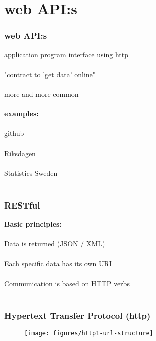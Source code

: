 \documentclass{beamer}
\begin{document}
\section{web API:s}

\begin{frame}
	\frametitle{web API:s}
	\begin{center}
		application program interface using http  \\~\\
		"contract to 'get data' online"  \\~\\
		more and more common  \\~\\
		\textbf{examples:}  \\~\\
		github \\~\\
		Riksdagen \\~\\
		Statistics Sweden \\~\\
	\end{center}
\end{frame}

\begin{frame}
	\frametitle{RESTful}
	\begin{center}
		\textbf{Basic principles:} \\~\\
		Data is returned (JSON / XML) \\~\\
		Each specific data has its own URI \\~\\
		Communication is based on HTTP verbs \\~\\
	\end{center}
\end{frame}

\begin{frame}
	\frametitle{Hypertext Transfer Protocol (http)}
	\begin{center}
		\begin{figure}
			\texttt{[image: figures/http1-url-structure]}
			\label{fig:io}
		\end{figure}
	\end{center}
\end{frame}
\end{document}
